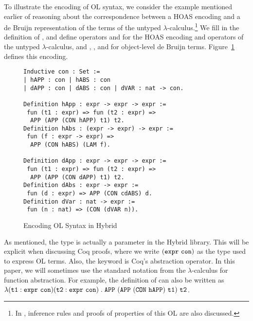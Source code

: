 To illustrate the encoding of OL syntax, we consider the example
mentioned earlier of reasoning about the correspondence between a HOAS
encoding and a de Bruijn representation of the terms of the untyped
$\lambda$-calculus.\footnote{In \cite{WCGN:PPDP13}, inference rules
  and proofs of properties of this OL are also discussed.}
%
We fill in the definition of , and define operators
 and  for the HOAS encoding and operators of the
untyped $\lambda$-calculus, and , , and
 for object-level de Bruijn terms.
Figure~\ref{fig:olsyntax} defines this encoding.
%
\begin{figure}
\begin{lstlisting}
Inductive con : Set := 
| hAPP : con | hABS : con
| dAPP : con | dABS : con | dVAR : nat -> con.

Definition hApp : expr -> expr -> expr :=
 fun (t1 : expr) => fun (t2 : expr) =>
  APP (APP (CON hAPP) t1) t2. 
Definition hAbs : (expr -> expr) -> expr :=
 fun (f : expr -> expr) => 
  APP (CON hABS) (LAM f).

Definition dApp : expr -> expr -> expr :=
 fun (t1 : expr) => fun (t2 : expr) =>
  APP (APP (CON dAPP) t1) t2. 
Definition dAbs : expr -> expr :=
 fun (d : expr) => APP (CON cdABS) d.
Definition dVar : nat -> expr :=
 fun (n : nat) => (CON (dVAR n)).
\end{lstlisting}
\caption{Encoding OL Syntax in Hybrid \label{fig:olsyntax}}
\end{figure}
%
As mentioned, the type  is actually a parameter in
the Hybrid library. This will be explicit when discussing Coq proofs,
where we write $(\texttt{expr}~ \texttt{con})$ as the type used to express
OL terms.  Also, the keyword  is Coq's abstraction
operator.  In this paper, we will sometimes use the standard notation
from the $\lambda$-calculus for function abstraction.  For example,
the definition of  can also be written as $\lambda (\texttt{t1} :
\texttt{expr}~ \texttt{con}) (\texttt{t2} : \texttt{expr}~ \texttt{con}) \; . \;
\texttt{APP}~ (\texttt{APP}~ (\texttt{CON}~ \texttt{hAPP})~ \texttt{t1})~
\texttt{t2}$.


